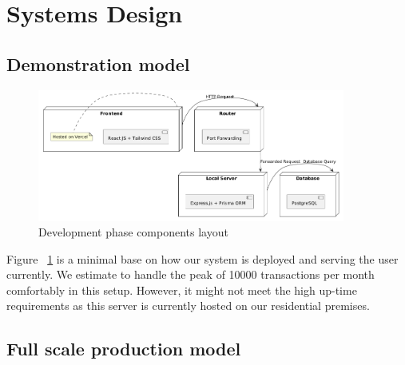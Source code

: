 \section{Systems Design}


\subsection{Demonstration model}

\begin{figure}[!h]
	\centering
	\includegraphics[width=0.9\textwidth]{chapters/ch-04/401_deploy_local.png} %
	\caption{Development phase components layout}
	\label{fig:deploy_1} %
\end{figure}

Figure ~\ref{fig:deploy_1} is a minimal base on how our system is deployed and serving the user currently. We estimate to handle the peak of 10000 transactions per month comfortably in this setup. However, it might not meet the high up-time requirements as this server is currently hosted on our residential premises.

\subsection{Full scale production model}

